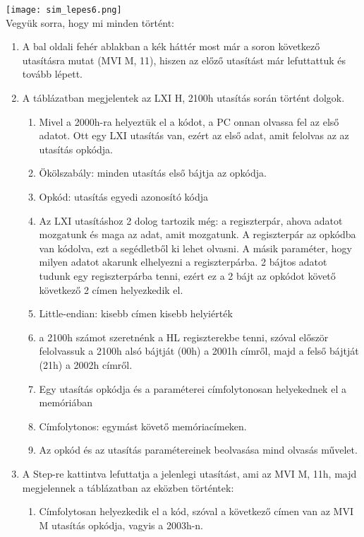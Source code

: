 \texttt{[image: sim\_lepes6.png]} \\
Vegyük sorra, hogy mi minden történt:
\begin{enumerate}
  \item A bal oldali fehér ablakban a kék háttér most már a soron következő utasításra mutat (MVI   M, 11), hiszen az előző utasítást már lefuttattuk és tovább lépett.
  \item A táblázatban megjelentek az LXI H, 2100h utasítás során történt dolgok.
  \begin{enumerate}
    \item Mivel a 2000h-ra helyeztük el a kódot, a PC onnan olvassa fel az első adatot. Ott egy LXI utasítás van, ezért az első adat, amit felolvas az az utasítás opkódja.
    \item \colorbox{orange!30}{Ökölszabály: minden utasítás első bájtja az opkódja.}
    \item \colorbox{orange!30}{Opkód: utasítás egyedi azonosító kódja}
    \item Az LXI utasításhoz 2 dolog tartozik még: a regiszterpár, ahova adatot mozgatunk és maga az adat, amit mozgatunk. A regiszterpár az opkódba van kódolva, ezt a segédletből ki lehet olvasni. A másik paraméter, hogy milyen adatot akarunk elhelyezni a regiszterpárba. 2 bájtos adatot tudunk egy regiszterpárba tenni, ezért ez a 2 bájt az opkódot követő következő 2 címen helyezkedik el.
    \item \colorbox{orange!30}{Little-endian: kisebb címen kisebb helyiérték}
    \item a 2100h számot szeretnénk a HL regiszterekbe tenni, szóval először felolvassuk a 2100h alsó bájtját (00h) a 2001h címről, majd a felső bájtját (21h) a 2002h címről.
    \item \colorbox{orange!30}{Egy utasítás opkódja és a paraméterei címfolytonosan helyekednek el a memóriában}
    \item \colorbox{orange!30}{Címfolytonos: egymást követő memóriacímeken.}
    \item \colorbox{orange!30}{Az opkód és az utasítás paramétereinek beolvasása mind olvasás művelet.}
  \end{enumerate}
  \item A Step-re kattintva lefuttatja a jelenlegi utasítást, ami az MVI M, 11h, majd megjelennek a táblázatban az eközben történtek:
  \begin{enumerate}
    \item Címfolytosan helyezkedik el a kód, szóval a következő címen van az MVI M utasítás opkódja, vagyis a 2003h-n.

\end{enumerate}
\end{enumerate}
